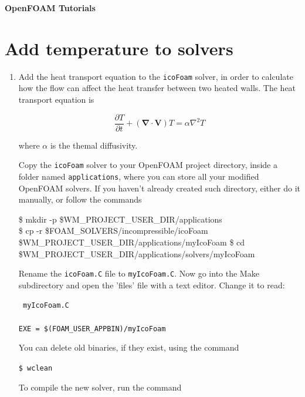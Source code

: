 \documentclass{article}
\newcommand\tab[1][0.5cm]{\hspace*{#1}}
\begin{document}
	

\noindent
\begin{huge}
\hspace{-3.0mm}\textbf{OpenFOAM Tutorials}
\end{huge}

\setcounter{section}{1}
\section{Add temperature to solvers}
	
\begin{enumerate}
	\item Add  the heat transport equation to the {\tt icoFoam} solver, in order to calculate how the flow can affect the heat transfer between two heated walls. The heat transport equation is
	
	$$
	\dfrac{\partial T}{\partial t} + (\bm{\nabla}\cdot \bm{V}) T = \alpha \nabla^2 T
	$$

	where $\alpha$ is the themal diffusivity.
	
	Copy the {\tt icoFoam} solver to your OpenFOAM project directory, inside a folder named {\tt applications}, where you can store all your modified OpenFOAM solvers. If you haven't already created such directory, either do it manually, or follow the commands
	
	{\tt
		
	\tab	\$ mkdir -p \$WM\_PROJECT\_USER\_DIR/applications \\
	\tab 	\$ cp -r \$FOAM\_SOLVERS/incompressible/icoFoam \$WM\_PROJECT\_USER\_DIR/applications/myIcoFoam
	\tab \$ cd \$WM\_PROJECT\_USER\_DIR/applications/solvers/myIcoFoam
	}
	
	\vspace{0.2cm}
	
	Rename the {\tt icoFoam.C} file to {\tt myIcoFoam.C}. Now go into the Make subdirectory and open the 'files' file with a text editor. Change it to read: 


	\begin{myframe}
	{\tt %
	 myIcoFoam.C \\%
	 \\%
	 EXE = \$(FOAM\_USER\_APPBIN)/myIcoFoam}
 	\end{myframe}


	You can delete old binaries, if they exist, using the command
	
	{\tt \tab \$ wclean}
	
	To compile the new solver, run the command
	

\end{enumerate}
\end{document}
